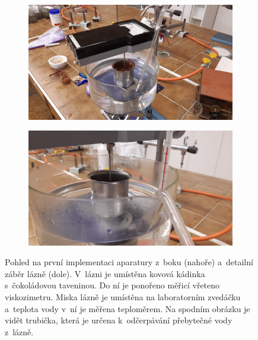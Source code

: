 \documentclass[12pt]{article}
\begin{document}
\begin{figure}[h!]
    \begin{subfigure}[b]{\textwidth}
    \centering
        \includegraphics[width = \textwidth]{prilohy/aparatura_lab_bok.jpg}
    \end{subfigure}
    \hfill
    \begin{subfigure}[b]{\textwidth}
        \includegraphics[width = \textwidth]{prilohy/lab_lázeň.jpg}
    \end{subfigure}
    \caption{Pohled na první implementaci aparatury z~boku (nahoře) a~detailní záběr lázně (dole). V~lázni je umístěna kovová kádinka s~čokoládovou taveninou. Do ní je ponořeno měřicí vřeteno viskozimetru. Miska lázně je umístěna na laboratorním zvedáčku a~teplota vody v~ní je měřena teploměrem. Na spodním obrázku je vidět trubička, která je určena k~odčerpávání přebytečné vody z~lázně.}
    \label{fig:aparatura_lab}
\end{figure}
\end{document}

